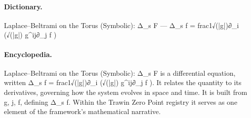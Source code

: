 \paragraph{Dictionary.}
Laplace–Beltrami on the Torus (Symbolic): Δ\_s F — Δ\_s f = frac1√(|g|)∂\_i (√(|g|) g\textasciicircum{}ij∂\_j f )

\paragraph{Encyclopedia.}
Laplace–Beltrami on the Torus (Symbolic): Δ\_s F is a differential equation, written Δ\_s f = frac1√(|g|)∂\_i (√(|g|) g\textasciicircum{}ij∂\_j f ). It relates the quantity to its derivatives, governing how the system evolves in space and time. It is built from g, j, f, defining Δ\_s f. Within the Trawin Zero Point registry it serves as one element of the framework's mathematical narrative.
